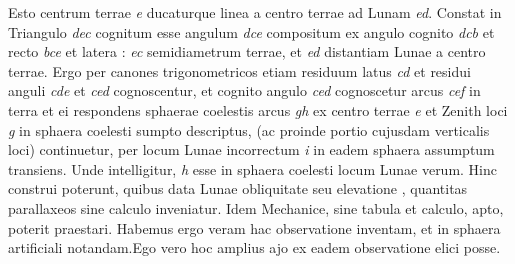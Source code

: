                      Esto centrum terrae \textit{e} ducaturque linea a centro terrae ad Lunam\protect{} \textit{ed}. Constat in Triangulo \textit{dec} cognitum esse angulum  \textit{dce} compositum ex angulo cognito \textit{dcb} et recto \textit{bce} et  latera : \textit{ec} semidiametrum terrae, et \textit{ed} distantiam Lunae\protect{} a centro terrae. Ergo per canones trigonometricos etiam  residuum latus \textit{cd} et  residui anguli \textit{cde} et \textit{ced} cognoscentur, et cognito angulo \textit{ced} cognoscetur arcus \textit{cef} in terra et ei respondens  sphaerae coelestis arcus \textit{gh} ex centro terrae \textit{e} et Zenith loci \textit{g} in sphaera coelesti sumpto descriptus, (ac proinde  portio cujusdam verticalis loci)  continuetur, per locum Lunae\protect{} incorrectum \textit{i} in eadem sphaera assumptum transiens. Unde intelligitur, \textit{h} esse in sphaera coelesti locum Lunae\protect{} verum. Hinc  construi poterunt, quibus data Lunae\protect{} obliquitate seu elevatione , quantitas parallaxeos\protect{} sine calculo inveniatur. Idem Mechanice, sine tabula et calculo,  apto, poterit praestari. Habemus ergo veram \protect{} \protect{} hac observatione inventam, et in sphaera artificiali notandam.\pend \pstart Ego vero hoc amplius ajo ex eadem observatione  elici posse.\pend \pstart 